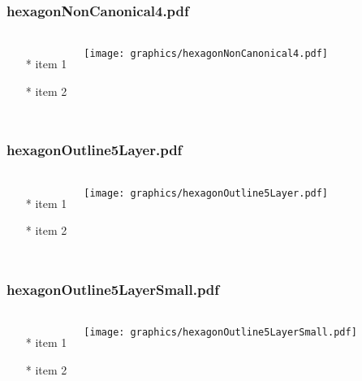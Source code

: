 \begin{frame} \frametitle{hexagonNonCanonical4.pdf}
    \begin{columns}[c]
        \begin{itemize}
            \item[*] item 1
            \item[*] item 2
        \end{itemize}
        \begin{minipage}{\linewidth}
            \begin{center}
            \texttt{[image: graphics/hexagonNonCanonical4.pdf]}
            \label{gfx:hexagonNonCanonical4.pdf}
            \end{center}
        \end{minipage}
    \end{columns}
\end{frame}
\begin{frame} \frametitle{hexagonOutline5Layer.pdf}
    \begin{columns}[c]
        \begin{itemize}
            \item[*] item 1
            \item[*] item 2
        \end{itemize}
        \begin{minipage}{\linewidth}
            \begin{center}
            \texttt{[image: graphics/hexagonOutline5Layer.pdf]}
            \label{gfx:hexagonOutline5Layer.pdf}
            \end{center}
        \end{minipage}
    \end{columns}
\end{frame}
\begin{frame} \frametitle{hexagonOutline5LayerSmall.pdf}
    \begin{columns}[c]
        \begin{itemize}
            \item[*] item 1
            \item[*] item 2
        \end{itemize}
        \begin{minipage}{\linewidth}
            \begin{center}
            \texttt{[image: graphics/hexagonOutline5LayerSmall.pdf]}
            \label{gfx:hexagonOutline5LayerSmall.pdf}
            \end{center}
        \end{minipage}
    \end{columns}
\end{frame}
